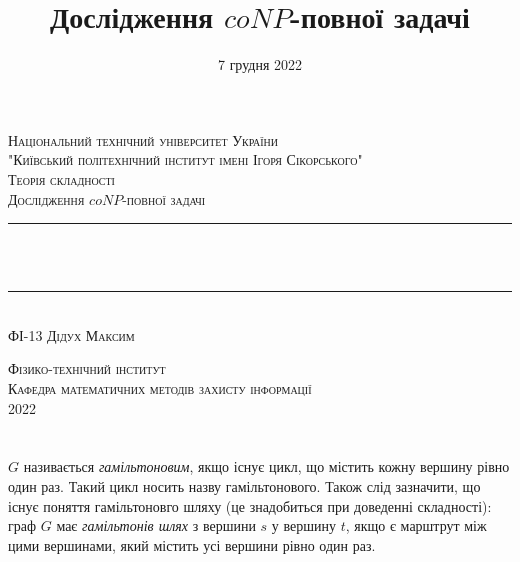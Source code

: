 \documentclass[14pt]{article}
\begin{document}
\begin{spacing}{1.175}	
	\begin{titlepage} 
		\newcommand{\HRule}{\rule{\linewidth}{0.3mm}}
		\center 
		
		\textsc{\large Національний технічний університет України
			\\"Київський політехнічний інститут імені Ігоря Сікорського"}\\[1.5cm]
		
		\vspace{5cm}
		\textsc{\large Теорія складності}\\[0.5cm]
		
		\textsc{\large Дослідження \(coNP\)-повної задачі}\\[0.5cm] 
		
		\HRule\\[0.4cm]
		
		{\huge {}}\\[0.4cm]
		
		\HRule\\[1.5cm]
		\textsc{\large ФІ-13 Дідух Максим}\\[0.5cm]
		
		\vspace{7.5cm}
		
		\textsc{\large Фізико-технічний інститут}\\[0.5cm]
		\textsc{\large Кафедра математичних методів захисту інформації}\\[0.5cm]
		{\large {2022}} 
	\end{titlepage}
    
    
    
    \newpage
    \title{\Large Дослідження \(coNP\)-повної задачі}
    \date{\large 7 грудня 2022}
    \maketitle
    \tableofcontents                                                                            %
    \newpage
    \section{}
         \(G\) називається \textit{гамільтоновим}, якщо існує цикл, що містить кожну вершину рівно один раз. Такий цикл носить назву гамільтонового. Також слід зазначити, що існує поняття гамільтоновго шляху (це знадобиться при доведенні складності): граф \(G\) має \textit{гамільтонів шлях} з вершини \(s\) у вершину \(t\), якщо є марштрут між цими вершинами, який містить усі вершини рівно один раз.
        

\end{spacing}
\end{document}

